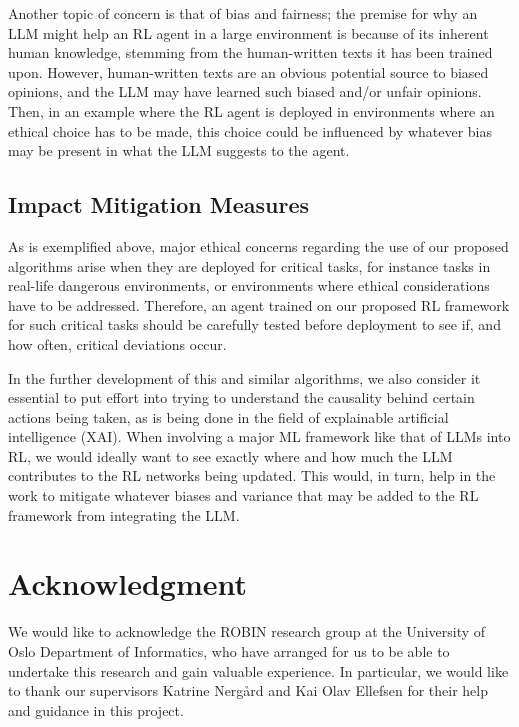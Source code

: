 \documentclass[conference]{IEEEtran}
\begin{document}
Another topic of concern is that of bias and fairness; the premise for why an LLM might help an RL agent in a large environment is because of its inherent human knowledge, stemming from the human-written texts it has been trained upon. However, human-written texts are an obvious potential source to biased opinions, and the LLM may have learned such biased and/or unfair opinions. Then, in an example where the RL agent is deployed in environments where an ethical choice has to be made, this choice could be influenced by whatever bias may be present in what the LLM suggests to the agent.

\subsection*{Impact Mitigation Measures}

As is exemplified above, major ethical concerns regarding the use of our proposed algorithms arise when they are deployed for critical tasks, for instance tasks in real-life dangerous environments, or environments where ethical considerations have to be addressed. Therefore, an agent trained on our proposed RL framework for such critical tasks should be carefully tested before deployment to see if, and how often, critical deviations occur.

In the further development of this and similar algorithms, we also consider it essential to put effort into trying to understand the causality behind certain actions being taken, as is being done in the field of explainable artificial intelligence (XAI). When involving a major ML framework like that of LLMs into RL, we would ideally want to see exactly where and how much the LLM contributes to the RL networks being updated. This would, in turn, help in the work to mitigate whatever biases and variance that may be added to the RL framework from integrating the LLM.

\section*{Acknowledgment}

We would like to acknowledge the ROBIN research group at the University of Oslo Department of Informatics, who have arranged for us to be able to undertake this research and gain valuable experience. In particular, we would like to thank our supervisors Katrine Nergård and Kai Olav Ellefsen for their help and guidance in this project.



\end{document}
